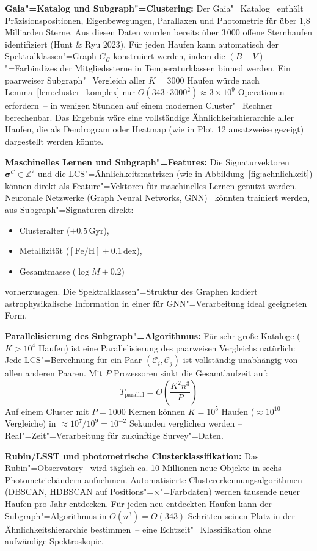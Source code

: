 ﻿\documentclass[a4paper,12pt]{article}
\theoremstyle{definition}
\begin{document}
\textbf{Gaia"=Katalog und Subgraph"=Clustering:}
Der Gaia"=Katalog~\cite{prusti2016} enthält Präzisionspositionen,
Eigenbewegungen, Parallaxen und Photometrie für über 1,8 Milliarden Sterne.
Aus diesen Daten wurden bereits über 3\,000 offene Sternhaufen identifiziert
(Hunt \& Ryu 2023). Für jeden Haufen kann automatisch der
Spektralklassen"=Graph $G_{\mathcal{C}}$ konstruiert werden, indem die
$(B-V)$"=Farbindizes der Mitgliedssterne in Temperaturklassen binned werden.
Ein paarweiser Subgraph"=Vergleich aller $K = 3000$ Haufen
würde nach Lemma~\ref{lem:cluster_komplex} nur
$O(343 \cdot 3000^2) \approx 3 \times 10^9$ Operationen erfordern~--
in wenigen Stunden auf einem modernen Cluster"=Rechner berechenbar.
Das Ergebnis wäre eine vollständige Ähnlichkeitshierarchie aller Haufen,
die als Dendrogram oder Heatmap (wie in Plot~12 ansatzweise gezeigt)
dargestellt werden könnte.

\textbf{Maschinelles Lernen und Subgraph"=Features:}
Die Signaturvektoren $\boldsymbol{\sigma}^{\mathcal{C}} \in \mathbb{Z}^7$
und die LCS"=Ähnlichkeitsmatrizen (wie in Abbildung~\ref{fig:aehnlichkeit})
können direkt als Feature"=Vektoren für maschinelles Lernen genutzt werden.
Neuronale Netzwerke (Graph Neural Networks, GNN)~\cite{kipf2017} könnten
trainiert werden, aus Subgraph"=Signaturen direkt:
\begin{itemize}
    \item Clusteralter ($\pm 0.5\,\text{Gyr}$),
    \item Metallizität ($[\text{Fe/H}] \pm 0.1\,\text{dex}$),
    \item Gesamtmasse ($\log M \pm 0.2$)
\end{itemize}
vorherzusagen. Die Spektralklassen"=Struktur des Graphen kodiert
astrophysikalische Information in einer für GNN"=Verarbeitung
ideal geeigneten Form.

\textbf{Parallelisierung des Subgraph"=Algorithmus:}
Für sehr große Kataloge ($K > 10^4$ Haufen) ist eine Parallelisierung
des paarweisen Vergleichs natürlich: Jede LCS"=Berechnung für ein Paar
$(\mathcal{C}_i, \mathcal{C}_j)$ ist vollständig unabhängig von allen
anderen Paaren. Mit $P$ Prozessoren sinkt die Gesamtlaufzeit auf:
\[
    T_{\text{parallel}} = O\!\left(\frac{K^2 n^3}{P}\right)
\]
Auf einem Cluster mit $P = 1000$ Kernen können $K = 10^5$ Haufen
($\approx 10^{10}$ Vergleiche) in $\approx 10^7 / 10^9 = 10^{-2}$ Sekunden
verglichen werden -- Real"=Zeit"=Verarbeitung für zukünftige Survey"=Daten.

\textbf{Rubin/LSST und photometrische Clusterklassifikation:}
Das Rubin"=Observatory~\cite{ivezic2019} wird täglich ca. 10 Millionen
neue Objekte in sechs Photometriebändern aufnehmen. Automatisierte
Clustererkennungsalgorithmen (DBSCAN, HDBSCAN auf Positions"=$\times$"=Farbdaten)
werden tausende neuer Haufen pro Jahr entdecken. Für jeden neu entdeckten Haufen
kann der Subgraph"=Algorithmus in $O(n^3) = O(343)$ Schritten seinen
Platz in der Ähnlichkeitshierarchie bestimmen~-- eine Echtzeit"=Klassifikation
ohne aufwändige Spektroskopie.
\end{document}
